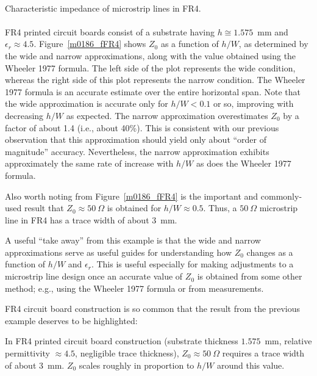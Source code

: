 ~\\ \begin{example} 
\label{m0186_exFR4}
\begin{mdframed}[backgroundcolor=brown!20,linecolor=brown!20]\raggedright
Characteristic impedance of microstrip lines in FR4.
\\~\\
FR4 printed circuit boards consist of a substrate having $h\cong 1.575$~mm and $\epsilon_r\approx 4.5$.
Figure~\ref{m0186_fFR4} shows $Z_0$ as a function of $h/W$, as determined by the wide and narrow approximations, along with the value obtained using the Wheeler 1977 formula.
The left side of the plot represents the wide condition, whereas the right side of this plot represents the narrow condition.
The Wheeler 1977 formula is an accurate estimate over the entire horizontal span.
Note that the wide approximation is accurate only for $h/W<0.1$ or so, improving with decreasing $h/W$ as expected.
The narrow approximation overestimates $Z_0$ by a factor of about 1.4 (i.e., about 40\%). 
This is consistent with our previous observation that this approximation should yield only about ``order of magnitude'' accuracy. 
Nevertheless, the narrow approximation exhibits approximately the same rate of increase with $h/W$ as does the Wheeler 1977 formula.

Also worth noting from Figure~\ref{m0186_fFR4} is the important and commonly-used result that $Z_0\approx 50~\Omega$ is obtained for $h/W\approx 0.5$.
Thus, a $50~\Omega$ microstrip line in FR4 has a trace width of about 3~mm.   
\end{mdframed}
\end{example}

A useful ``take away'' from this example is that the wide and narrow approximations serve as useful guides for understanding how $Z_0$ changes as a function of $h/W$ and $\epsilon_r$.  This is useful especially for making adjustments to a microstrip line design once an accurate value of $Z_0$ is obtained from some other method; e.g., using the Wheeler 1977 formula or from measurements.

FR4 circuit board construction is so common that the result from the previous example deserves to be highlighted:
%
\begin{mdframed}[backgroundcolor=yellow!20,nobreak=true] 
In FR4 printed circuit board construction (substrate thickness $1.575$~mm, relative permittivity $\approx 4.5$, negligible trace thickness), $Z_0\approx 50~\Omega$ requires a trace width of about 3~mm.  $Z_0$ scales roughly in proportion to $h/W$ around this value.
\end{mdframed}

